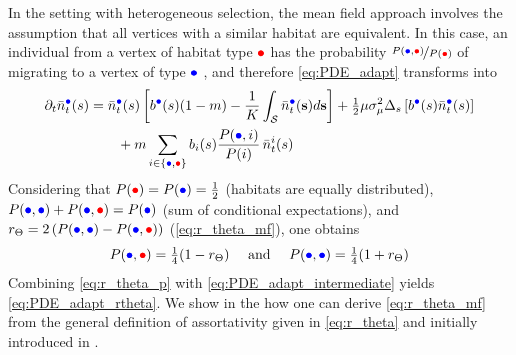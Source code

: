 %
In the setting with heterogeneous selection, the mean field approach involves the assumption that all vertices with a similar habitat are equivalent. In this case, an individual from a vertex of habitat type $\rcirc$ has the probability $\nicefrac{P({\bcirc},{\rcirc})}{P({\rcirc})}$ of migrating to a vertex of type $\bcirc$ , and therefore \cref{eq:PDE_adapt} transforms into
%
\begin{equation}
\begin{split}\label{eq:PDE_adapt_intermediate}
    \partial_t \bar{n}_t^{{\bcirc}}(s) &= \bar{n}_t^{{\bcirc}}(s)\left[b^{{\bcirc}}(s) (1-m) -  \frac{1}{K}\int_\mathcal{S}  \bar{n}_t^{{\bcirc}}({\textbf s}) d{\textbf s}  \right] + \tfrac{1}{2} \mu \sigma_\mu^2 \Delta_s \left[ b^{{\bcirc}}(s) \bar{n}_t^{{\bcirc}}(s)\right] \\
    & \qquad + m \sum_{{i} \in \{{\bcirc},{\rcirc}\}}  b_{i}(s) \frac{P({\bcirc},{i})}{P({i})} \, \bar{n}_t^{{i}}(s)
\end{split}
\end{equation}
%
Considering that $P({\rcirc}) = P({\bcirc}) = \tfrac{1}{2}$ (habitats are equally distributed), $P(\bcirc,\bcirc) + P(\bcirc,\rcirc) = P(\bcirc) $ (sum of conditional expectations), and $r_\Theta = 2 \left( P({\bcirc},{\bcirc}) - P({\bcirc},{\rcirc}) \right)$ (\cref{eq:r_theta_mf}), one obtains
\begin{equation}\label{eq:r_theta_p}
  P(\bcirc,\rcirc) = \tfrac{1}{4} (1 - r_\Theta) \quad \text{ and } \quad P(\bcirc,\bcirc) = \tfrac{1}{4} (1 + r_\Theta)
\end{equation} 
Combining \cref{eq:r_theta_p} with \cref{eq:PDE_adapt_intermediate} yields \cref{eq:PDE_adapt_rtheta}.
%
We show in the  how one can derive \cref{eq:r_theta_mf} from the general definition of assortativity given in \cref{eq:r_theta} and initially introduced in \cite{Newman2003a}.

